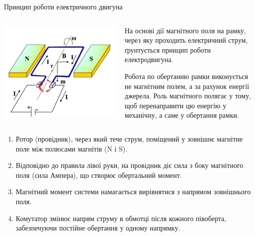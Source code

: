 \documentclass{beamer}
\begin{document}
\begin{frame}{Принцип роботи електричного двигуна}{}

	\begin{columns}
		\begin{column}{0.4\linewidth}\centering\scriptsize
			\includegraphics[width=1\linewidth]{motor}
		\end{column}
		\begin{column}{0.6\linewidth}
			\begin{block}{}\justifying
				На основі дії магнітного поля на рамку, через яку проходить електричний струм, ґрунтується принцип роботи електродвигуна.
			\end{block}
            \begin{alertblock}{}\justifying\small
                Робота по обертанню рамки виконується не магнітним полем, а за рахунок енергії джерела. Роль магнітного полягає у тому, щоб
                перенаправити цю енергію у механічну, а саме у обертання рамки.
            \end{alertblock}
		\end{column}
	\end{columns}
	\begin{block}{}\scriptsize
		\begin{enumerate}
			\item Ротор (провідник), через який тече струм, поміщений у зовнішнє магнітне поле між полюсами магнітів (N і S).
			\item Відповідно до правила лівої руки, на провідник діє сила з боку магнітного поля (сила Ампера), що створює обертальний момент.
			\item Магнітний момент системи намагається вирівнятися з напрямом зовнішнього поля.
			\item Комутатор змінює напрям струму в обмотці після кожного півоберта, забезпечуючи постійне обертання у одному напрямку.
		\end{enumerate}
	\end{block}
\end{frame}
\end{document}
